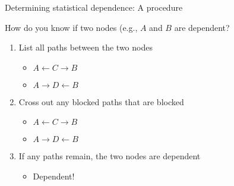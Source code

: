 \documentclass{beamer}
\begin{document}
\begin{frame}{Determining statistical dependence: A procedure}

How do you know if two nodes (e.g., $A$ and $B$ are dependent? \pause
\begin{center}
\end{center} \pause
\begin{enumerate}
\item List all paths between the two nodes
\begin{itemize}
\item $A\leftarrow C \rightarrow B$
\item $A\rightarrow D \leftarrow B$
\end{itemize} \pause
\item Cross out any blocked paths that are blocked
\begin{itemize}
\item $A\leftarrow C \rightarrow B$
\item \st{$A\rightarrow D \leftarrow B$}
\end{itemize} \pause
\item If any paths remain, the two nodes are dependent
\begin{itemize}
\item Dependent!
\end{itemize}
\end{enumerate}

\end{frame}

\end{document}
